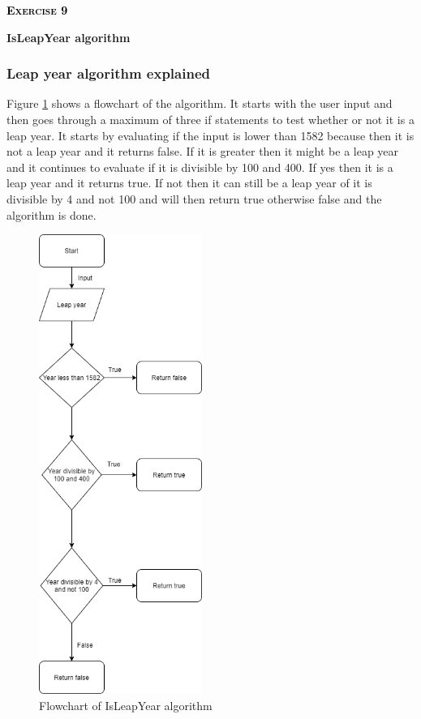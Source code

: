 \documentclass[12pt,a4paper]{article}
\begin{document}

\begin{center}
	{\scshape\Large\bfseries \textcolor{black}{Exercise 9}\par}
	\vspace{1pt} {\large \textbf{IsLeapYear algorithm}\par}
\end{center}
\justifying

\subsubsection*{Leap year algorithm explained}
Figure \ref{fig:FlowLeapYear} shows a flowchart of the algorithm. It starts with the user input and then goes through a maximum of three if statements to test whether or not it is a leap year. It starts by evaluating if the input is lower than 1582 because then it is not a leap year and it returns false. If it is greater then it might be a leap year and it continues to evaluate if it is divisible by 100 and 400. If yes then it is a leap year and it returns true. If not then it can still be a leap year of it is divisible by 4 and not 100 and will then return true otherwise false and the algorithm is done.

\begin{figure}[H]
    \centering
    \includegraphics[height=15cm]{Exercise 8.png}
    \caption{Flowchart of IsLeapYear algorithm}
    \label{fig:FlowLeapYear}
\end{figure}



\end{document}
